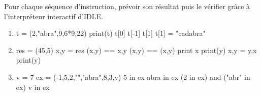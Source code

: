 Pour chaque séquence d'instruction, prévoir son résultat puis le vérifier grâce à l'interpréteur interactif d'IDLE.

\begin{enumerate}[label=\emph{\alph*)}]
\item 
\begin{pyverbatim}
t = (2,"abra",9,6*9,22)
print(t)
t[0]
t[-1]
t[1]
t[1] = "cadabra" 
\end{pyverbatim}
\item 
\begin{pyverbatim}
res = (45,5)
x,y = res
(x,y) == x,y
(x,y) == (x,y)
print x
print(y)
x,y = y,x
print(y)
\end{pyverbatim}
\item 
\begin{pyverbatim}
v = 7
ex = (-1,5,2,"","abra",8,3,v)
5 in ex
abra in ex
(2 in ex) and ("abr" in ex)
v in ex
\end{pyverbatim}
\end{enumerate}